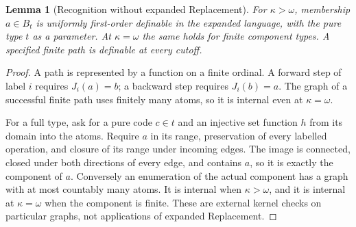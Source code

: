 \documentclass[11pt,letterpaper]{article}
\numberwithin{equation}{section}
\theoremstyle{plain}
\newtheorem{lemma}[lemma]{Lemma}
\theoremstyle{definition}
\theoremstyle{remark}
\begin{document}
\begin{lemma}[Recognition without expanded Replacement]\label{nee:ca:lem:recognition}
For $\kappa>\omega$, membership $a\in B_t$ is uniformly first-order definable in the expanded language, with the pure type $t$ as a parameter. At $\kappa=\omega$ the same holds for finite component types. A specified finite path is definable at every cutoff.
\end{lemma}
\begin{proof}
A path is represented by a function on a finite ordinal. A forward step of label $i$ requires $J_i(a)=b$; a backward step requires $J_i(b)=a$. The graph of a successful finite path uses finitely many atoms, so it is internal even at $\kappa=\omega$.

For a full type, ask for a pure code $c\in t$ and an injective set function $h$ from its domain into the atoms. Require $a$ in its range, preservation of every labelled operation, and closure of its range under incoming edges. The image is connected, closed under both directions of every edge, and contains $a$, so it is exactly the component of $a$. Conversely an enumeration of the actual component has a graph with at most countably many atoms. It is internal when $\kappa>\omega$, and it is internal at $\kappa=\omega$ when the component is finite. These are external kernel checks on particular graphs, not applications of expanded Replacement.
\end{proof}
\end{document}
